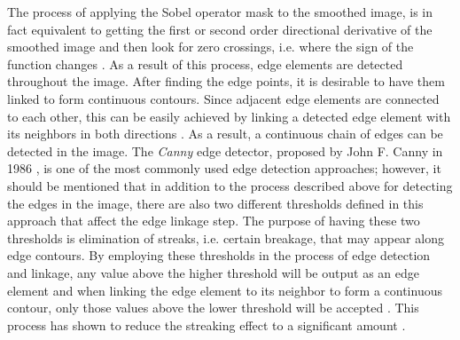 The process of applying the Sobel operator mask \cite{sobel78} to the smoothed image, is in fact equivalent to getting the first or second order directional derivative of the smoothed image 
and then look for zero crossings, i.e. where the sign of
the function changes \cite{sze11}. As a result of this process, edge elements are detected throughout the image.
After finding the edge points, it is desirable to have them linked to form continuous contours. Since adjacent edge elements are connected to each other, this can be easily achieved by linking
a detected edge element with its neighbors in both directions \cite{sze11}. As a result, a continuous chain of edges can be detected in the image.
The {\it Canny} edge detector, proposed by John F. Canny in 1986 \cite{canny86}, is one of the most commonly used edge detection approaches; however, it should be mentioned that in addition 
to the process described above for detecting the edges in the image, there are also two different thresholds defined 
in this approach that affect the edge linkage step. The purpose of having these two thresholds is elimination of streaks, i.e. certain breakage, that may appear along edge contours. 
By employing these thresholds in the process of edge detection and linkage, any value above the higher threshold will be output as an edge element and when linking the edge element 
to its neighbor to form a continuous contour, only those 
values above the lower threshold will be accepted \cite{canny86}. This process has shown to reduce the streaking effect to a significant amount \cite{canny86}. \newline


